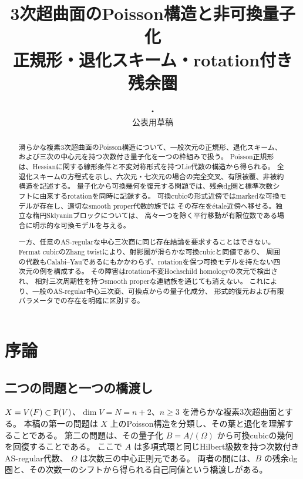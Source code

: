 
\title{3次超曲面のPoisson構造と非可換量子化\\
\large 正規形・退化スキーム・rotation付き残余圏}
\author{}
\date{\DocDate・\DocVersion\\\small 公表用草稿}

\maketitle
\begin{abstract}
滑らかな複素3次超曲面のPoisson構造について、一般次元の正規形、退化スキーム、
および三次の中心元を持つ次数付き量子化を一つの枠組みで扱う。
Poisson正規形は、Hessianに関する線形条件と不変対称形式を持つLie代数の構造から得られる。
全退化スキームの方程式を示し、六次元・七次元の場合の完全交叉、有限被覆、非被約構造を記述する。
量子化から可換幾何を復元する問題では、残余dg圏と標準次数シフトに由来するrotationを同時に記録する。
可換cubicの形式近傍ではmarkedな可換モデルが存在し、適切なsmooth proper代数的族では
その存在をétale近傍へ移せる。独立な楕円Sklyaninブロックについては、
高々一つを除く平行移動が有限位数である場合に明示的な可換モデルを与える。

一方、任意のAS-regularな中心三次商に同じ存在結論を要求することはできない。
Fermat cubicのZhang twistにより、射影圏が滑らかな可換cubicと同値であり、
周囲の代数もCalabi--Yauであるにもかかわらず、rotationを保つ可換モデルを持たない四次元の例を構成する。
その障害はrotation不変Hochschild homologyの次元で検出され、
相対三次周期性を持つsmooth properな連結族を通じても消えない。
これにより、一般のAS-regular中心三次商、可換点からの量子化成分、
形式的復元および有限パラメータでの存在を明確に区別する。
\end{abstract}
\tableofcontents

\section{序論}\label{sec:global-intro}

\subsection{二つの問題と一つの橋渡し}

\(X=V(F)\subset\mathbb P(V)\)、\(\dim V=N=n+2\)、\(n\ge3\) を滑らかな複素3次超曲面とする。
本稿の第一の問題は \(X\) 上のPoisson構造を分類し、その葉と退化を理解することである。
第二の問題は、その量子化 \(B=A/(\Omega)\) から可換cubicの幾何を回復することである。
ここで \(A\) は多項式環と同じHilbert級数を持つ次数付きAS-regular代数、
\(\Omega\) は次数三の中心正則元である。
両者の間には、\(B\) の残余dg圏と、その次数一のシフトから得られる自己同値という橋渡しがある。

